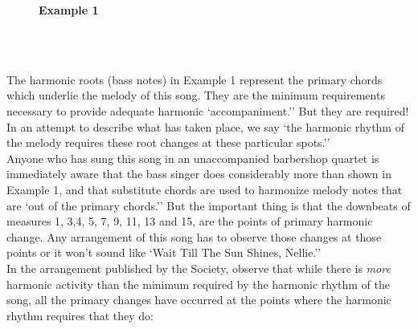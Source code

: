 \documentclass{article} %
\numberwithin{equation}{section} %
\begin{document}
		\begin{figure}[H]
		\textbf{Example 1}
		
		\\

		\\
		\end{figure}

		The harmonic roots (bass notes) in Example 1 represent the primary chords which underlie the melody of this song. They are the minimum requirements necessary to provide adequate harmonic `accompaniment.'' But they are required! In an attempt to describe what has taken place, we say `the harmonic rhythm of the melody requires these root changes at these particular spots.'' \\

		Anyone who has sung this song in an unaccompanied barbershop quartet is immediately aware that the bass singer does considerably more than shown in Example 1, and that substitute chords are used to harmonize melody notes that are `out of the primary chords.'' But the important thing is that the downbeats of measures 1, 3,4, 5, 7, 9, 11, 13 and 15, are the points of primary harmonic change. Any arrangement of this song has to observe those changes at those points or it won't sound like `Wait Till The Sun Shines, Nellie.'' \\

		In the arrangement published by the Society, observe that while there is \textit{more} harmonic activity than the minimum required by the harmonic rhythm of the song, all the primary changes have occurred at the points where the harmonic rhythm requires that they do:\\
\end{document}
